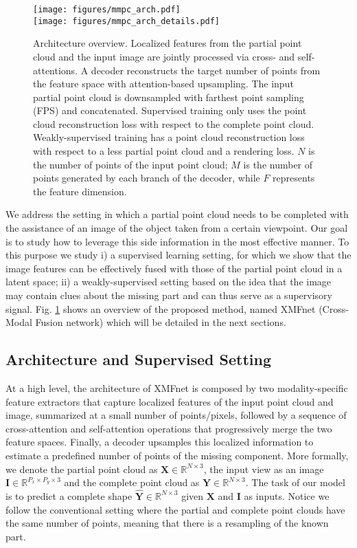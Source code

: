 \documentclass{article}
\newcommand{\Xb}{\mathbf{X}}
\newcommand{\Yb}{\mathbf{Y}}
\newcommand{\Ib}{\mathbf{I}}
\newcommand{\Yh}{\mathbf{\hat{Y}}}
\begin{document}
\begin{figure}
  \centering
    \texttt{[image: figures/mmpc\_arch.pdf]}\\ \vspace*{15pt}
    \texttt{[image: figures/mmpc\_arch\_details.pdf]}
    \vspace{-10pt}
  \caption{Architecture overview. Localized features from the partial point cloud and the input image are jointly processed via cross- and self-attentions. A decoder reconstructs the target number of points from the feature space with attention-based upsampling. The input partial point cloud is downsampled with farthest point sampling (FPS) and concatenated. Supervised training only uses the point cloud reconstruction loss with respect to the complete point cloud. Weakly-supervised training has a point cloud reconstruction loss with respect to a less partial point cloud and a rendering loss. $N$ is the number of points of the input point cloud; $M$ is the number of points generated by each branch of the decoder, while $F$ represents the feature dimension.}
  \label{fig:arch}
  \vspace{-10pt}
\end{figure}

We address the setting in which a partial point cloud needs to be completed with the assistance of an image of the object taken from a certain viewpoint. Our goal is to study how to leverage this side information in the most effective manner. To this purpose we study i) a supervised learning setting, for which we show that the image features can be effectively fused with those of the partial point cloud in a latent space; ii) a weakly-supervised setting based on the idea that the image may contain clues about the missing part and can thus serve as a supervisory signal. Fig. \ref{fig:arch} shows an overview of the proposed method, named XMFnet (Cross-Modal Fusion network) which will be detailed in the next sections.



\subsection{Architecture and Supervised Setting} 
\label{sec:arch}

At a high level, the architecture of XMFnet is composed by two modality-specific feature extractors that capture localized features of the input point cloud and image, summarized at a small number of points/pixels, followed by a sequence of cross-attention and self-attention operations that progressively merge the two feature spaces. Finally, a decoder upsamples this localized information to estimate a predefined number of points of the missing component. More formally, we denote the partial point cloud as $\Xb \in \mathbb{R}^{N \times 3}$, the input view as an image $\Ib \in \mathbb{R}^{P_x \times P_y \times 3}$ and the complete point cloud as $\Yb \in \mathbb{R}^{N \times 3}$. The task of our model is to predict a complete shape $\Yh \in \mathbb{R}^{N \times 3}$ given $\Xb$ and $\Ib$ as inputs. Notice we follow the conventional setting where the partial and complete point clouds have the same number of points, meaning that there is a resampling of the known part.
\end{document}
